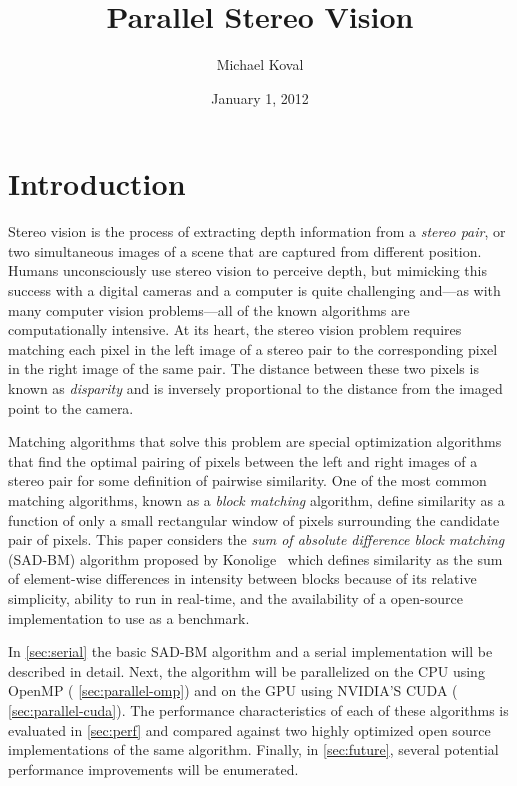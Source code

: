 \documentclass{article}
\title{Parallel Stereo Vision}
\author{Michael Koval}
\date{January 1, 2012}
\let\orgautoref\autoref
\providecommand{\Cref}
        {\def\equationautorefname{Equation}%
         \def\figureautorefname{Figure}%
         \def\subfigureautorefname{Figure}%
         \def\Itemautorefname{Item}%
         \def\tableautorefname{Table}%
         \def\sectionautorefname{Section}%
         \def\subsectionautorefname{Section}%
         \def\subsubsectionautorefname{Section}%
         \def\chapterautorefname{Section}%
         \def\partautorefname{Part}%
         \orgautoref}
\begin{document}
\maketitle

\section{Introduction}
\label{sec:intro}
Stereo vision is the process of extracting depth information from a
\textit{stereo pair}, or two simultaneous images of a scene that are captured
from different position. Humans unconsciously use stereo vision to perceive
depth, but mimicking this success with a digital cameras and a computer is
quite challenging and---as with many computer vision problems---all of the
known algorithms are computationally intensive. At its heart, the stereo vision
problem requires matching each pixel in the left image of a stereo pair to the
corresponding pixel in the right image of the same pair. The distance between
these two pixels is known as \textit{disparity} and is inversely proportional
to the distance from the imaged point to the camera.

Matching algorithms that solve this problem are special optimization algorithms
that find the optimal pairing of pixels between the left and right images of a
stereo pair for some definition of pairwise similarity. One of the most common
matching algorithms, known as a \textit{block matching} algorithm, define
similarity as a function of only a small rectangular window of pixels
surrounding the candidate pair of pixels. This paper considers the \textit{sum
of absolute difference block matching} (SAD-BM) algorithm proposed by
Konolige~\cite{konolige97} which defines similarity as the sum of element-wise
differences in intensity between blocks because of its relative simplicity,
ability to run in real-time, and the availability of a open-source
implementation to use as a benchmark.

In \Cref{sec:serial} the basic SAD-BM algorithm and a serial implementation
will be described in detail. Next, the algorithm will be parallelized on the
CPU using OpenMP (\Cref{sec:parallel-omp}) and on the GPU using NVIDIA'S
CUDA (\Cref{sec:parallel-cuda}). The performance characteristics of each of
these algorithms is evaluated in \Cref{sec:perf} and compared against two
highly optimized open source implementations of the same algorithm. Finally, in
\Cref{sec:future}, several potential performance improvements will be
enumerated.
\end{document}
